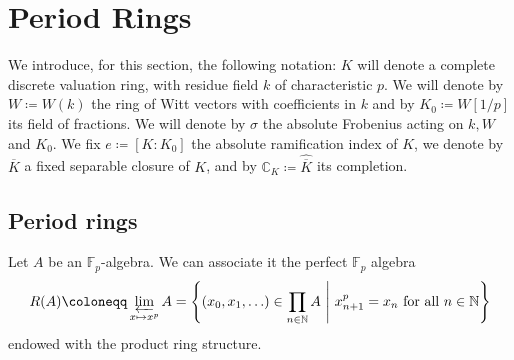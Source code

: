 \section{Period Rings}
%
We introduce, for this section, the following notation:
$K$ will denote a complete discrete valuation ring, with residue field $k$
of characteristic $p$.
We will denote by $W \coloneqq W(k)$ the ring of Witt vectors with coefficients in $k$
and by $K_0 \coloneqq W[1/p]$ its field of fractions.
We will denote by $\sigma$ the absolute Frobenius acting
on $k, W$ and $K_0$.
We fix $e \coloneqq [ K : K_0 ]$ the absolute ramification index of $K$,
we denote by $\overline{K}$ a fixed separable closure of $K$,
and by $\mathbb{C}_K \coloneqq \widehat{\overline{K}}$ its completion.



\subsection{Period rings}
\begin{defn}[]
	Let $A$ be an $\mathbb{F}_p$-algebra.
	We can associate it the perfect $\mathbb{F}_p$ algebra
	\begin{equation*}
		R(A) \coloneqq \varprojlim_{x \mapsto x^p} A =
		\left\{ \left( x_0, x_1, \ldots \right) \in \prod_{n \in \mathbb{N}} A
		\ \middle|\ x_{n+1}^p = x_n \text{ for all } n \in \mathbb{N} \right\}
	\end{equation*}
	endowed with the product ring structure.
\end{defn}


